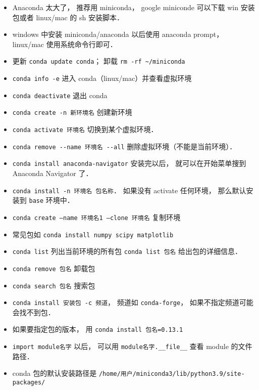
\begin{itemize}
\item Anaconda 太大了， 推荐用 miniconda， google miniconde 可以下载 win 安装包或者 linux/mac 的 sh 安装脚本．
\item windows 中安装 miniconda/anaconda 以后使用 anaconda prompt， linux/mac 使用系统命令行即可．
\item 更新 \verb|conda update conda|； 卸载 \verb|rm -rf ~/miniconda|
\item \verb|conda info -e| 进入 conda（linux/mac）并查看虚拟环境
\item \verb|conda deactivate| 退出 conda
\item \verb|conda create -n 新环境名| 创建新环境
\item \verb|conda activate 环境名| 切换到某个虚拟环境．
\item \verb|conda remove --name 环境名 --all| 删除虚拟环境（不能是当前环境）．
\item \verb|conda install anaconda-navigator| 安装完以后， 就可以在开始菜单搜到 Anaconda Navigator 了．
\item \verb|conda install -n 环境名 包名称|． 如果没有 activate 任何环境， 那么默认安装到 \verb|base| 环境中．
\item \verb|conda create —name 环境名1 —clone 环境名| 复制环境
\item 常见包如 \verb|conda install numpy scipy matplotlib|
\item \verb|conda list| 列出当前环境的所有包 \verb|conda list 包名| 给出包的详细信息．
\item \verb|conda remove 包名| 卸载包
\item \verb|conda search 包名| 搜索包
\item \verb|conda install 安装包 -c 频道|， 频道如 \verb|conda-forge|， 如果不指定频道可能会找不到包．
\item 如果要指定包的版本， 用 \verb|conda install 包名=0.13.1|
\item \verb|import module名字| 以后， 可以用 \verb|module名字.__file__| 查看 module 的文件路径．
\item conda 包的默认安装路径是 \verb|/home/用户/miniconda3/lib/python3.9/site-packages/|
\end{itemize}
